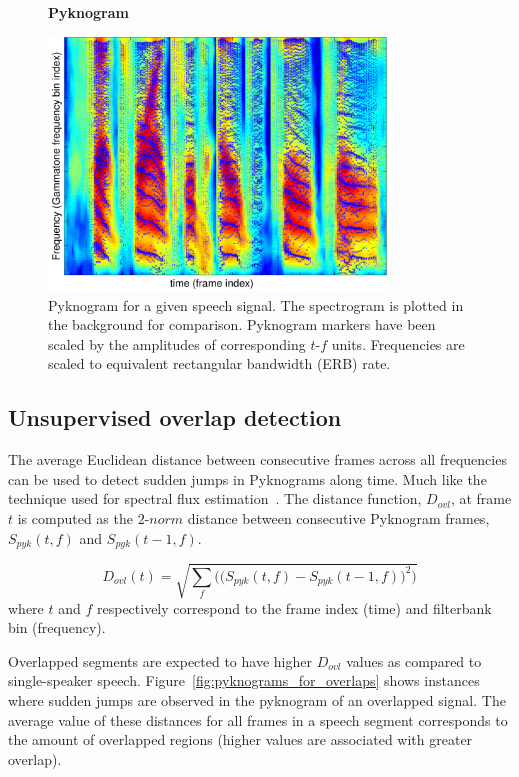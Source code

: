 {\begin{figure}[h!]
	\centering
	\vspace{4mm}
	\textbf{Pyknogram}\par\medskip
	\includegraphics[height =3.in, width=0.8\textwidth]{figures/pyknogram_vs_spectrogram}
	\vspace{-1mm}
	\caption{Pyknogram for a given speech signal. The spectrogram is plotted in the background for comparison. Pyknogram markers have been scaled by the amplitudes of corresponding $t$-$f$ units. Frequencies are scaled to equivalent rectangular bandwidth (ERB) rate.}
	\vspace{-1mm}
	\label{fig:pyknograms}
\end{figure}

\subsection{Unsupervised overlap detection}
The average Euclidean distance between consecutive frames across all frequencies can be used to detect sudden jumps in Pyknograms along time. 
Much like the technique used for spectral flux estimation~\cite{Rossignol_spectralflux}. 
The distance function, $D_{ovl}$, at frame $t$ is computed as the $2$-$norm$ distance between consecutive Pyknogram frames, $S_{pyk}(t,f)$ and $S_{pyk}(t-1,f)$. 

\begin{equation}
\label{eq:ovl_det_score}
D_{ovl}(t) = \sqrt{\sum_f\Big(\big(S_{pyk}(t,f)-S_{pyk}(t-1,f)\big)^2\Big)}
\end{equation}
where $t$ and $f$ respectively correspond to the frame index (time) and filterbank bin (frequency). 

Overlapped segments are expected to have higher $D_{ovl}$ values as compared to single-speaker speech. 
Figure~\ref{fig:pyknograms_for_overlaps} shows instances where sudden jumps are observed in the pyknogram of an overlapped signal. 
The average value of these distances for all frames in a speech segment corresponds to the amount of overlapped regions (higher values are associated with greater overlap). 

}
